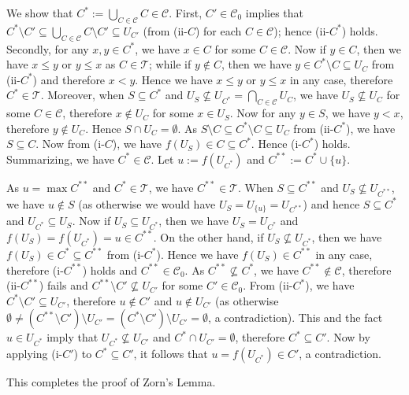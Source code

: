\documentclass{article}
\begin{document}
We show that $C^* := \bigcup_{C \in \mathcal{C}} C \in \mathcal{C}$.
First, $C' \in \mathcal{C}_0$ implies that $C^* \setminus C' \subseteq \bigcup_{C \in \mathcal{C}} C \setminus C' \subseteq U_{C'}$ (from (ii-$C$) for each $C \in \mathcal{C}$); hence (ii-$C^*$) holds.
Secondly, for any $x,y \in C^*$, we have $x \in C$ for some $C \in \mathcal{C}$.
Now if $y \in C$, then we have $x \leq y$ or $y \leq x$ as $C \in \mathcal{T}$; while if $y \not\in C$, then we have $y \in C^* \setminus C \subseteq U_C$ from (ii-$C^*$) and therefore $x < y$.
Hence we have $x \leq y$ or $y \leq x$ in any case, therefore $C^* \in \mathcal{T}$.
Moreover, when $S \subseteq C^*$ and $U_S \not\subseteq U_{C^*} = \bigcap_{C \in \mathcal{C}} U_C$, we have $U_S \not\subseteq U_C$ for some $C \in \mathcal{C}$, therefore $x \not\in U_C$ for some $x \in U_S$.
Now for any $y \in S$, we have $y < x$, therefore $y \not\in U_C$.
Hence $S \cap U_C = \emptyset$.
As $S \setminus C \subseteq C^* \setminus C \subseteq U_C$ from (ii-$C^*$), we have $S \subseteq C$.
Now from (i-$C$), we have $f(U_S) \in C \subseteq C^*$.
Hence (i-$C^*$) holds.
Summarizing, we have $C^* \in \mathcal{C}$.
Let $u := f(U_{C^*})$ and $C^{**} := C^* \cup \{u\}$.

As $u = \max C^{**}$ and $C^* \in \mathcal{T}$, we have $C^{**} \in \mathcal{T}$.
When $S \subseteq C^{**}$ and $U_S \not\subseteq U_{C^{**}}$, we have $u \not\in S$ (as otherwise we would have $U_S = U_{\{u\}} = U_{C^{**}}$) and hence $S \subseteq C^*$ and $U_{C^*} \subseteq U_S$.
Now if $U_S \subseteq U_{C^*}$, then we have $U_S = U_{C^*}$ and $f(U_S) = f(U_{C^*}) = u \in C^{**}$.
On the other hand, if $U_S \not\subseteq U_{C^*}$, then we have $f(U_S) \in C^* \subseteq C^{**}$ from (i-$C^*$).
Hence we have $f(U_S) \in C^{**}$ in any case, therefore (i-$C^{**}$) holds and $C^{**} \in \mathcal{C}_0$.
As $C^{**} \not\subseteq C^*$, we have $C^{**} \not\in \mathcal{C}$, therefore (ii-$C^{**}$) fails and $C^{**} \setminus C' \not\subseteq U_{C'}$ for some $C' \in \mathcal{C}_0$.
From (ii-$C^*$), we have $C^* \setminus C' \subseteq U_{C'}$, therefore $u \not\in C'$ and $u \not\in U_{C'}$ (as otherwise $\emptyset \neq (C^{**} \setminus C') \setminus U_{C'} = (C^* \setminus C') \setminus U_{C'} = \emptyset$, a contradiction).
This and the fact $u \in U_{C^*}$ imply that $U_{C^*} \not\subseteq U_{C'}$ and $C^* \cap U_{C'} = \emptyset$, therefore $C^* \subseteq C'$.
Now by applying (i-$C'$) to $C^* \subseteq C'$, it follows that $u = f(U_{C^*}) \in C'$, a contradiction.

This completes the proof of Zorn's Lemma.
\end{document}
